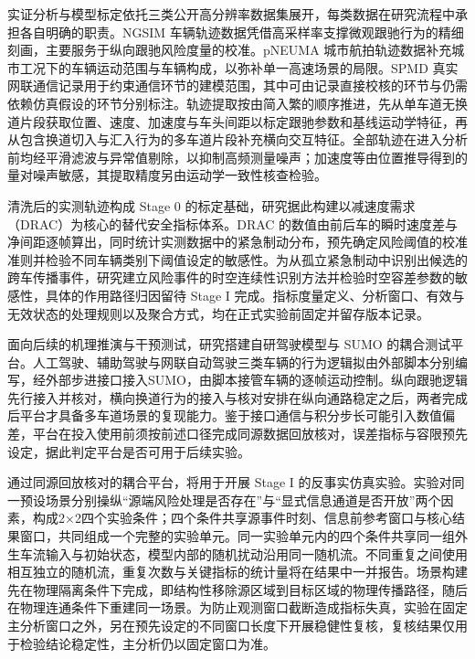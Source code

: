 \documentclass[oneside,doctype=proposal,fontset=windows,times=true]{tongjithesis}
\begin{document}
%
\begin{tjformbody}
实证分析与模型标定依托三类公开高分辨率数据集展开，每类数据在研究流程中承担各自明确的职责。NGSIM 车辆轨迹数据凭借高采样率支撑微观跟驰行为的精细刻画，主要服务于纵向跟驰风险度量的校准\cite{coifman2017}。pNEUMA 城市航拍轨迹数据补充城市工况下的车辆运动范围与车辆构成，以弥补单一高速场景的局限\cite{barmpounakis2020}。SPMD 真实网联通信记录用于约束通信环节的建模范围，其中可由记录直接校核的环节与仍需依赖仿真假设的环节分别标注。轨迹提取按由简入繁的顺序推进，先从单车道无换道片段获取位置、速度、加速度与车头间距以标定跟驰参数和基线运动学特征，再从包含换道切入与汇入行为的多车道片段补充横向交互特征。全部轨迹在进入分析前均经平滑滤波与异常值剔除，以抑制高频测量噪声；加速度等由位置推导得到的量对噪声敏感，其提取精度另由运动学一致性核查检验\cite{coifman2024}。

清洗后的实测轨迹构成 Stage 0 的标定基础，研究据此构建以减速度需求（DRAC）为核心的替代安全指标体系。DRAC 的数值由前后车的瞬时速度差与净间距逐帧算出，同时统计实测数据中的紧急制动分布，预先确定风险阈值的校准准则并检验不同车辆类别下阈值设定的敏感性\cite{fu2021}。为从孤立紧急制动中识别出候选的跨车传播事件，研究建立风险事件的时空连续性识别方法并检验时空容差参数的敏感性，具体的作用路径归因留待 Stage I 完成。指标度量定义、分析窗口、有效与无效状态的处理规则以及聚合方式，均在正式实验前固定并留存版本记录。

%
面向后续的机理推演与干预测试，研究搭建自研驾驶模型与 SUMO 的耦合测试平台。人工驾驶、辅助驾驶与网联自动驾驶三类车辆的行为逻辑拟由外部脚本分别编写，经外部步进接口接入SUMO，由脚本接管车辆的逐帧运动控制\cite{sumo2010}。纵向跟驰逻辑先行接入并核对，横向换道行为的接入与核对安排在纵向通路稳定之后，两者完成后平台才具备多车道场景的复现能力。鉴于接口通信与积分步长可能引入数值偏差，平台在投入使用前须按前述口径完成同源数据回放核对，误差指标与容限预先设定，据此判定平台是否可用于后续实验。

%
通过同源回放核对的耦合平台，将用于开展 Stage I 的反事实仿真实验。实验对同一预设场景分别操纵“源端风险处理是否存在”与“显式信息通道是否开放”两个因素，构成2×2四个实验条件；四个条件共享源事件时刻、信息前参考窗口与核心结果窗口，共同组成一个完整的实验单元。同一实验单元内的四个条件共享同一组外生车流输入与初始状态，模型内部的随机扰动沿用同一随机流。不同重复之间使用相互独立的随机流，重复次数与关键指标的统计量将在结果中一并报告。场景构建先在物理隔离条件下完成，即结构性移除源区域到目标区域的物理传播路径，随后在物理连通条件下重建同一场景。为防止观测窗口截断造成指标失真，实验在固定主分析窗口之外，另在预先设定的不同窗口长度下开展稳健性复核，复核结果仅用于检验结论稳定性，主分析仍以固定窗口为准。


\end{tjformbody}
\end{document}
